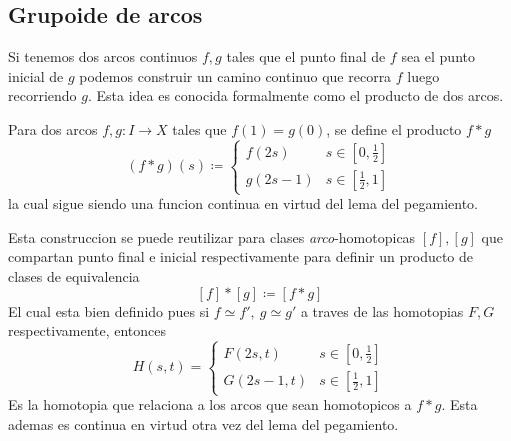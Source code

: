 \subsection{Grupoide de arcos}
Si tenemos dos arcos continuos \(f,g\) tales que el punto final de \(f\)
sea el punto inicial de \(g\) podemos construir un camino continuo que
recorra \(f\) luego recorriendo \(g\). Esta idea es conocida formalmente
como el producto de dos arcos.

\begin{definicion}
Para dos arcos \(f,g : I \to X\) tales que
\(f(1) = g(0)\), se define el producto \(f * g \)
\[ (f*g) (s) \coloneqq \begin{cases}
    f(2s) & s \in [0,\frac{1}{2}] \\
    g(2s - 1) & s \in [\frac{1}{2} , 1]
  \end{cases}
\]
la cual sigue siendo una funcion continua en virtud del lema del
pegamiento.
\end{definicion}

Esta construccion se puede reutilizar para clases
\emph{arco}-homotopicas \([f],[g]\) que compartan punto final e inicial
respectivamente para definir un producto de clases de equivalencia
\[ [f] * [g] \coloneqq [f * g]\]
El cual esta bien definido pues si \(f \simeq f' ,\ g \simeq
g'\) a traves de las homotopias \(F, G\) respectivamente, entonces
\[
  H(s,t) = \begin{cases}
    F(2s,t) & s \in [0, \frac{1}{2}] \\
    G(2s - 1, t) & s \in [\frac{1}{2} , 1]
  \end{cases}
\]
Es la homotopia que relaciona a los arcos que sean homotopicos a
\(f*g\). Esta ademas es continua en virtud otra vez del lema del pegamiento.


